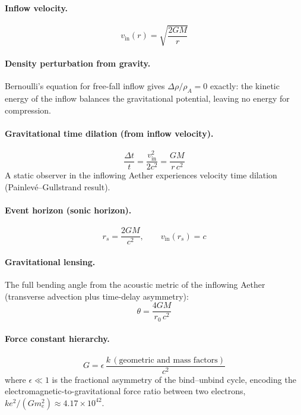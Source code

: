 ﻿\documentclass[12pt,letterpaper]{article}
\newcommand{\rhoa}{\rho_{\!A}}
\newcommand{\vin}{v_{\mathrm{in}}}
\begin{document}
\paragraph{Inflow velocity.}
%
\begin{equation}
  \vin(r) = \sqrt{\frac{2GM}{r}}
  \label{eq:sum-inflow}
\end{equation}
%
\paragraph{Density perturbation from gravity.}
Bernoulli's equation for free-fall inflow gives $\Delta\rho/\rhoa = 0$
exactly: the kinetic energy of the inflow balances the gravitational
potential, leaving no energy for compression.
%
\paragraph{Gravitational time dilation (from inflow velocity).}
%
\begin{equation}
  \frac{\Delta t}{t} = \frac{\vin^2}{2c^2} = \frac{GM}{r\,c^2}
  \label{eq:sum-grav-time-dilation}
\end{equation}
%
A static observer in the inflowing Aether experiences velocity time
dilation (Painlev\'{e}--Gullstrand result).

\paragraph{Event horizon (sonic horizon).}
%
\begin{equation}
  r_s = \frac{2GM}{c^2}, \qquad \vin(r_s) = c
  \label{eq:sum-schwarzschild}
\end{equation}

\paragraph{Gravitational lensing.}
The full bending angle from the acoustic metric of the inflowing Aether
(transverse advection plus time-delay asymmetry):
%
\begin{equation}
  \theta = \frac{4GM}{r_0\,c^2}
  \label{eq:sum-lensing}
\end{equation}

\paragraph{Force constant hierarchy.}
%
\begin{equation}
  G = \epsilon\,\frac{k\,(\text{geometric and mass factors})}{c^2}
  \label{eq:sum-G-from-k}
\end{equation}
%
where $\epsilon \ll 1$ is the fractional asymmetry of the bind--unbind cycle,
encoding the electromagnetic-to-gravitational force ratio between two
electrons, $ke^2/(Gm_e^2) \approx 4.17 \times 10^{42}$.
\end{document}

